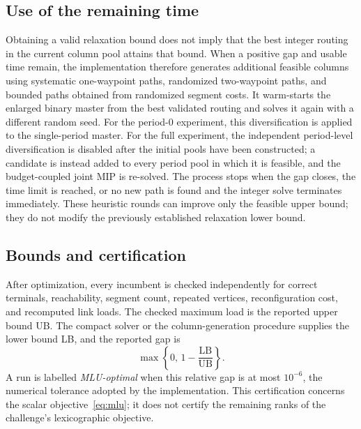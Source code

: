 \subsection{Use of the remaining time}

Obtaining a valid relaxation bound does not imply that the best integer routing in the current column
pool attains that bound. When a positive gap and usable time remain, the implementation therefore
generates additional feasible columns using systematic one-waypoint paths, randomized two-waypoint
paths, and bounded paths obtained from randomized segment costs. It warm-starts the enlarged binary
master from the best validated routing and solves it again with a different random seed. For the
period-0 experiment, this diversification is applied to the single-period master. For the full
experiment, the independent period-level diversification is disabled after the initial pools have been
constructed; a candidate is instead added to every period pool in which it is feasible, and the
budget-coupled joint MIP is re-solved. The process stops when the gap closes, the time limit is
reached, or no new path is found and the integer solve terminates immediately. These heuristic rounds
can improve only the feasible upper bound; they do not modify the previously established relaxation
lower bound.

\subsection{Bounds and certification}

After optimization, every incumbent is checked independently for correct terminals, reachability,
segment count, repeated vertices, reconfiguration cost, and recomputed link loads. The checked maximum
load is the reported upper bound UB. The compact solver or the column-generation procedure supplies
the lower bound LB, and the reported gap is
\[
\max\left\{0,\,1-\frac{\mathrm{LB}}{\mathrm{UB}}\right\}.
\]
A run is labelled \emph{MLU-optimal} when this relative gap is at most $10^{-6}$, the numerical
tolerance adopted by the implementation. This certification concerns the scalar
objective~\eqref{eq:mlu}; it does not certify the remaining ranks of the challenge's lexicographic
objective.
